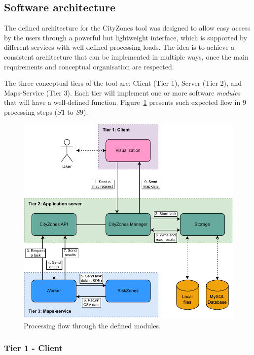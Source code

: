 \begin{refsection}
\subsection{Software architecture}

The defined architecture for the CityZones tool was designed to allow easy access by the users through a powerful but lightweight interface, which is supported by different services with well-defined processing loads. The idea is to achieve a consistent architecture that can be implemented in multiple ways, once the main requirements and conceptual organisation are respected.

The three conceptual tiers of the tool are: Client (Tier 1), Server (Tier 2), and Maps-Service (Tier 3). Each tier will implement one or more software \textit{modules} that will have a well-defined function. Figure~\ref{fig:flow} presents such expected flow in 9 processing steps ($S1$ to $S9$).

\begin{figure}[htb]
  \centering
  \includegraphics[width=\linewidth]{Chapters/3-CityZones/img/fluxograma_webapp.pdf}
  \caption{Processing flow through the defined modules.}\label{fig:flow}
\end{figure}

\subsubsection{Tier 1 - Client}


\end{refsection}
